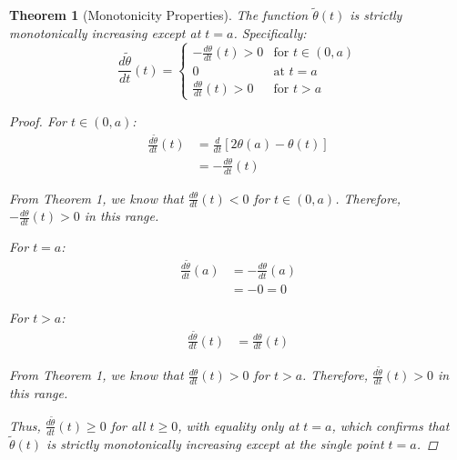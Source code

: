 \documentclass{article}
\newtheorem{theorem}{Theorem}
\theoremstyle{definition}
\begin{document}
\begin{theorem}[Monotonicity Properties]
The function $\tilde{\theta}(t)$ is strictly monotonically increasing except at $t = a$. Specifically:
\begin{equation}
\frac{d\tilde{\theta}}{dt}(t) = 
\begin{cases}
-\frac{d\theta}{dt}(t) > 0 & \text{for } t \in (0,a) \\
0 & \text{at } t = a \\
\frac{d\theta}{dt}(t) > 0 & \text{for } t > a
\end{cases}
\end{equation}

\begin{proof}
For $t \in (0,a)$:
\begin{align}
\frac{d\tilde{\theta}}{dt}(t) &= \frac{d}{dt}[2\theta(a) - \theta(t)] \\
&= -\frac{d\theta}{dt}(t)
\end{align}

From Theorem 1, we know that $\frac{d\theta}{dt}(t) < 0$ for $t \in (0,a)$. Therefore, $-\frac{d\theta}{dt}(t) > 0$ in this range.

For $t = a$:
\begin{align}
\frac{d\tilde{\theta}}{dt}(a) &= -\frac{d\theta}{dt}(a) \\
&= -0 = 0
\end{align}

For $t > a$:
\begin{align}
\frac{d\tilde{\theta}}{dt}(t) &= \frac{d\theta}{dt}(t)
\end{align}

From Theorem 1, we know that $\frac{d\theta}{dt}(t) > 0$ for $t > a$. Therefore, $\frac{d\tilde{\theta}}{dt}(t) > 0$ in this range.

Thus, $\frac{d\tilde{\theta}}{dt}(t) \geq 0$ for all $t \geq 0$, with equality only at $t = a$, which confirms that $\tilde{\theta}(t)$ is strictly monotonically increasing except at the single point $t = a$.
\end{proof}
\end{theorem}
\end{document}
